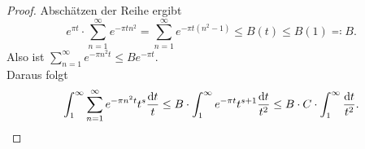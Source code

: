 \begin{frame}
    \begin{proof}
        Abschätzen der Reihe ergibt
        \[
            e^{\pi t} \cdot \sum_{n = 1}^{\infty} e^{-\pi t n^2} = \sum_{n = 1}^{\infty} e^{-\pi t (n^2-1)} \leq B(t) \leq B(1) \eqqcolon B.
        \]
        Also ist $\sum_{n = 1}^{\infty} e^{-\pi n^2 t} \leq B e^{-\pi t}$.\\
        Daraus folgt
        \[
            \int_1^\infty \sum_{n=1}^\infty e^{-\pi n^2 t} t^s \frac{\mathrm{d} t}{t} \leq B \cdot \int_1^\infty e^{-\pi t} t^{s+1} \frac{\mathrm{d} t}{t^2} \leq B\cdot C \cdot \int_1^\infty \frac{\mathrm{d} t}{t^2}.
        \]
    \end{proof}
\end{frame}